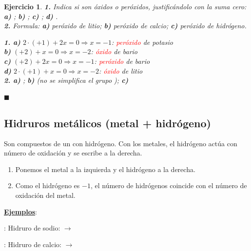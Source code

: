 \documentclass[12pt]{article}
\theoremstyle{mygreennumbox}
\newtheorem{ejercicioT}{Ejercicio}[section]
\newenvironment{exercise}{\begin{eBoxmygreen}\begin{ejercicioT}}{\hfill{\color{mygreen}\tiny\ensuremath{\blacksquare}}\end{ejercicioT}\end{eBoxmygreen}}
\newcommand{\formulan}{\vspace*{2mm}\noindent\xmybox{\bfseries ¿Cómo se formulan?}\par\smallskip}
\newcommand{\ejemplos}{\par\noindent\textbf{\uline{Ejemplos}}:\par}
\begin{document}
\begin{exercise}
    \textbf{1.} Indica si son óxidos o peróxidos, justificándolo con la suma cero: \textbf{a)} ; \textbf{b)} ; \textbf{c)} ; \textbf{d)} .\\
    \textbf{2.} Formula: \textbf{a)} peróxido de litio; \textbf{b)} peróxido de calcio; \textbf{c)} peróxido de hidrógeno.
    \begin{solu}
        \textbf{1. a)} \(2\cdot(+1) + 2x = 0 \Rightarrow x = -1\): \textcolor{red}{peróxido} de potasio\\
        \textbf{b)} \((+2) + x = 0 \Rightarrow x = -2\): \textcolor{red}{óxido} de bario\\
        \textbf{c)} \((+2) + 2x = 0 \Rightarrow x = -1\): \textcolor{red}{peróxido} de bario\\
        \textbf{d)} \(2\cdot(+1) + x = 0 \Rightarrow x = -2\): \textcolor{red}{óxido} de litio\\
        \textbf{2. a)} \textcolor{red}{}; \textbf{b)} \textcolor{red}{} (no se simplifica el grupo ); \textbf{c)} \textcolor{red}{}
    \end{solu}
\end{exercise}

\subsection{Hidruros metálicos (metal + hidrógeno)}\label{sec:hidruros}

Son compuestos de un  con hidrógeno. Con los metales, el hidrógeno actúa con número de oxidación  y se escribe a la derecha.

\formulan
\begin{enumerate}[label=\itembolascolor{\arabic*}{mygreen}]
    \item Ponemos el metal a la izquierda y el hidrógeno a la derecha.
    \item Como el hidrógeno es \(-1\), el número de hidrógenos coincide con el número de oxidación del metal.
\end{enumerate}

\ejemplos
{} : Hidruro de sodio:   \(\to\) 

 : Hidruro de calcio:   \(\to\) 
\end{document}
